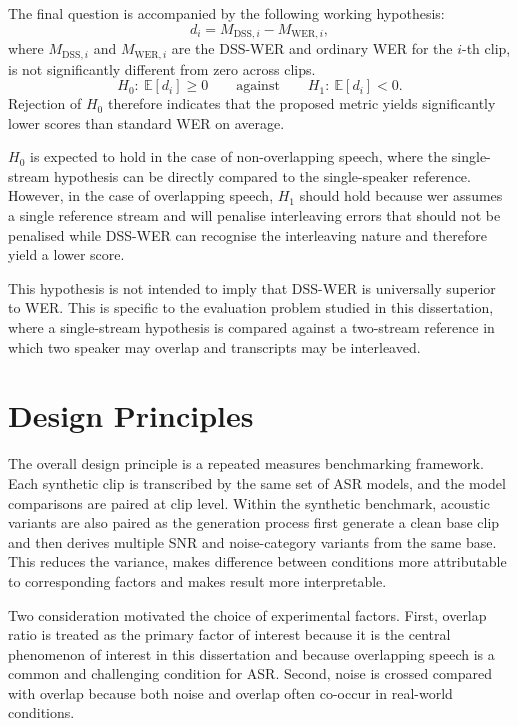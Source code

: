 The final question is accompanied by the following working hypothesis:
\begin{equation}
    d_i = M_{\text{DSS},i} - M_{\text{WER},i},
\end{equation}
where $M_{\text{DSS},i}$ and $M_{\text{WER},i}$ are the DSS-WER and ordinary WER for the $i$-th clip, is not significantly different from zero across clips.
\begin{equation}
H_0:\ \mathbb{E}[d_i] \ge 0
\qquad \text{against} \qquad
H_1:\ \mathbb{E}[d_i] < 0.
\end{equation}
Rejection of \(H_0\) therefore indicates that the proposed metric yields significantly lower scores than standard WER on average.

$H_0$ is expected to hold in the case of non-overlapping speech, where the single-stream hypothesis can be directly compared to the single-speaker reference. However, in the case of overlapping speech, $H_1$ should hold because wer assumes a single reference stream and will penalise interleaving errors that should not be penalised while DSS-WER can recognise the interleaving nature and therefore yield a lower score. 

This hypothesis is not intended to imply that DSS-WER is universally superior to WER. This is specific to the evaluation problem studied in this dissertation, where a single-stream hypothesis is compared against a two-stream reference in which two speaker may overlap and transcripts may be interleaved. 

\section{Design Principles}
The overall design principle is a repeated measures benchmarking framework. Each synthetic clip is transcribed by the same set of ASR models, and the model comparisons are paired at clip level. Within the synthetic benchmark, acoustic variants are also paired as the generation process first generate a clean base clip and then derives multiple SNR and noise-category variants from the same base. This reduces the variance, makes difference between conditions more attributable to corresponding factors and makes result more interpretable.

Two consideration motivated the choice of experimental factors. First, overlap ratio is treated as the primary factor of interest because it is the central phenomenon of interest in this dissertation and because overlapping speech is a common and challenging condition for ASR. Second, noise is crossed compared with overlap because both noise and overlap often co-occur in real-world conditions.

